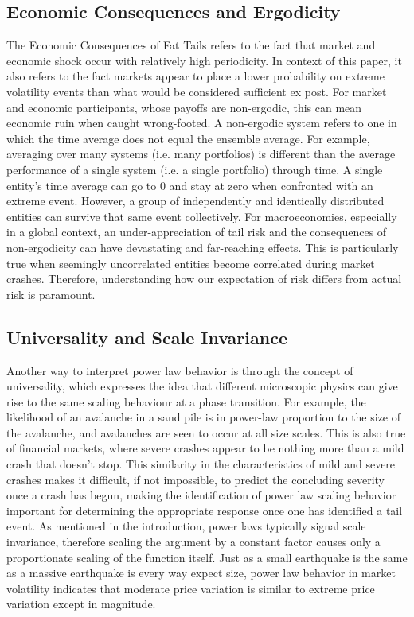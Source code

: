 \documentclass[11pt,a4paper,oldfontcommands]{memoir}
\begin{document}
{\subsection{Economic Consequences and Ergodicity}

The Economic Consequences of Fat Tails refers to the fact that market and economic shock occur with relatively high periodicity. In context of this paper, it also refers to the fact markets appear to place a lower probability on extreme volatility events than what would be considered sufficient ex post. For market and economic participants, whose payoffs are non-ergodic, this can mean economic ruin when caught wrong-footed. A non-ergodic system refers to one in which the time average does not equal the ensemble average. For example, averaging over many systems (i.e. many portfolios) is different than the average performance of a single system (i.e. a single portfolio) through time. A single entity's time average can go to 0 and stay at zero when confronted with an extreme event. However, a group of independently and identically distributed entities can survive that same event collectively. For macroeconomies, especially in a global context, an under-appreciation of tail risk and the consequences of non-ergodicity can have devastating and far-reaching effects. This is particularly true when seemingly uncorrelated entities become correlated during market crashes. Therefore, understanding how our expectation of risk differs from actual risk is paramount.

\subsection{Universality and Scale Invariance}

Another way to interpret power law behavior is through the concept of universality, which expresses the idea that different microscopic physics can give rise to the same scaling behaviour at a phase transition. For example, the likelihood of an avalanche in a sand pile is in power-law proportion to the size of the avalanche, and avalanches are seen to occur at all size scales. This is also true of financial markets, where severe crashes appear to be nothing more than a mild crash that doesn't stop. This similarity in the characteristics of mild and severe crashes makes it difficult, if not impossible, to predict the concluding severity once a crash has begun, making the identification of power law scaling behavior important for determining the appropriate response once one has identified a tail event. As mentioned in the introduction, power laws typically signal scale invariance, therefore scaling the argument by a constant factor causes only a proportionate scaling of the function itself. Just as a small earthquake is the same as a massive earthquake is every way expect size, power law behavior in market volatility indicates that moderate price variation is similar to extreme price variation except in magnitude. 




}
\end{document}
